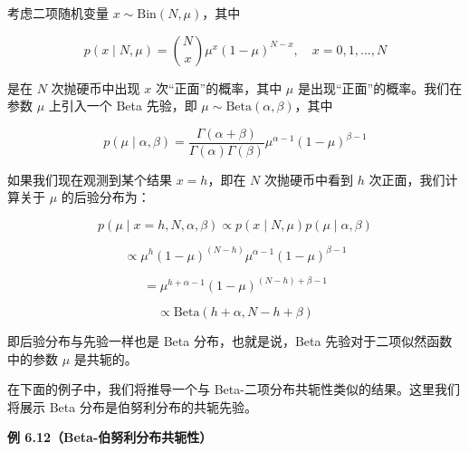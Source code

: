 \begin{notebox}
考虑二项随机变量 $ x \sim \mathrm{Bin}(N, \mu) $，其中

\begin{equation}
p(x \mid N, \mu) = \binom{N}{x} \mu^x (1 - \mu)^{N-x}, \quad x = 0, 1, \ldots, N
\tag{6.102}\label{eq:6-102}
\end{equation}

是在 $ N $ 次抛硬币中出现 $ x $ 次“正面”的概率，其中 $ \mu $ 是出现“正面”的概率。我们在参数 $ \mu $ 上引入一个 Beta 先验，即 $ \mu \sim \mathrm{Beta}(\alpha, \beta) $，其中

\begin{equation}
p(\mu \mid \alpha, \beta) = \frac{\Gamma(\alpha + \beta)}{\Gamma(\alpha)\Gamma(\beta)} \mu^{\alpha-1} (1 - \mu)^{\beta-1}
\tag{6.103}\label{eq:6-103}
\end{equation}

如果我们现在观测到某个结果 $ x = h $，即在 $ N $ 次抛硬币中看到 $ h $ 次正面，我们计算关于 $ \mu $ 的后验分布为：

\begin{equation}
p(\mu \mid x = h, N, \alpha, \beta) \propto p(x \mid N, \mu) p(\mu \mid \alpha, \beta)
\tag{6.104a}\label{eq:6-104a}
\end{equation}

\begin{equation}
\propto \mu^h (1 - \mu)^{(N-h)} \mu^{\alpha-1} (1 - \mu)^{\beta-1}
\tag{6.104b}\label{eq:6-104b}
\end{equation}

\begin{equation}
= \mu^{h+\alpha-1} (1 - \mu)^{(N-h)+\beta-1}
\tag{6.104c}\label{eq:6-104c}
\end{equation}

\begin{equation}
\propto \mathrm{Beta}(h + \alpha, N - h + \beta)
\tag{6.104d}\label{eq:6-104d}
\end{equation}

即后验分布与先验一样也是 Beta 分布，也就是说，Beta 先验对于二项似然函数中的参数 $ \mu $ 是共轭的。
\end{notebox}

在下面的例子中，我们将推导一个与 Beta-二项分布共轭性类似的结果。这里我们将展示 Beta 分布是伯努利分布的共轭先验。

\begin{notebox}
\textbf{例 6.12（Beta-伯努利分布共轭性）}
\end{notebox}

